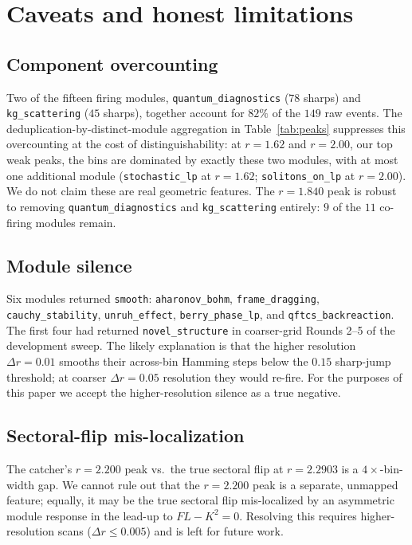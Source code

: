 \documentclass[11pt,letterpaper]{article}
\begin{document}
\section{Caveats and honest limitations}\label{sec:caveats}

\subsection{Component overcounting}\label{ssec:overcount}

Two of the fifteen firing modules, \texttt{quantum\_diagnostics} ($78$ sharps) and \texttt{kg\_scattering} ($45$ sharps), together account for $82\%$ of the $149$ raw events. The deduplication-by-distinct-module aggregation in Table~\ref{tab:peaks} suppresses this overcounting at the cost of distinguishability: at $r = 1.62$ and $r = 2.00$, our top weak peaks, the bins are dominated by exactly these two modules, with at most one additional module (\texttt{stochastic\_lp} at $r = 1.62$; \texttt{solitons\_on\_lp} at $r = 2.00$). We do not claim these are real geometric features. The $r = 1.840$ peak is robust to removing \texttt{quantum\_diagnostics} and \texttt{kg\_scattering} entirely: $9$ of the $11$ co-firing modules remain.

\subsection{Module silence}

Six modules returned \texttt{smooth}: \texttt{aharonov\_bohm}, \texttt{frame\_dragging}, \texttt{cauchy\_stability}, \texttt{unruh\_effect}, \texttt{berry\_phase\_lp}, and \texttt{qftcs\_backreaction}. The first four had returned \texttt{novel\_structure} in coarser-grid Rounds 2--5 of the development sweep. The likely explanation is that the higher resolution $\Delta r = 0.01$ smooths their across-bin Hamming steps below the $0.15$ sharp-jump threshold; at coarser $\Delta r = 0.05$ resolution they would re-fire. For the purposes of this paper we accept the higher-resolution silence as a true negative.

\subsection{Sectoral-flip mis-localization}

The catcher's $r = 2.200$ peak vs.\ the true sectoral flip at $r = 2.2903$ is a $4\times$-bin-width gap. We cannot rule out that the $r = 2.200$ peak is a separate, unmapped feature; equally, it may be the true sectoral flip mis-localized by an asymmetric module response in the lead-up to $FL - K^2 = 0$. Resolving this requires higher-resolution scans ($\Delta r \le 0.005$) and is left for future work.
\end{document}

